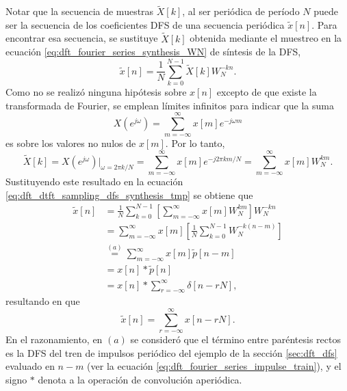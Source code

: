 \documentclass[a4paper]{report}
\begin{document}
Notar que la secuencia de muestras \(\tilde{X}[k]\), al ser periódica de período \(N\) puede ser la secuencia de los coeficientes DFS de una secuencia periódica \(\tilde{x}[n]\). Para encontrar esa secuencia, se sustituye \(\tilde{X}[k]\) obtenida mediante el muestreo en la ecuación \ref{eq:dft_fourier_series_synthesis_WN} de síntesis de la DFS,
\begin{equation}\label{eq:dft_dtft_sampling_dfs_synthesis_tmp}
 \tilde{x}[n]=\frac{1}{N}\sum_{k=0}^{N-1}\tilde{X}[k]W_N^{-kn}. 
\end{equation}
Como no se realizó ninguna hipótesis sobre \(x[n]\) excepto de que existe la transformada de Fourier, se emplean límites infinitos para indicar que la suma
\[
 X(e^{j\omega})=\sum_{m=-\infty}^\infty x[m]e^{-j\omega m}
\]
es sobre los valores no nulos de \(x[m]\). Por lo tanto,
\[
 \tilde{X}[k]=X(e^{j\omega})\Big|_{\omega=2\pi k/N}=\sum_{m=-\infty}^\infty x[m]e^{-j2\pi km/N}
 =\sum_{m=-\infty}^\infty x[m]W_N^{km}.
\]
Sustituyendo este resultado en la ecuación \ref{eq:dft_dtft_sampling_dfs_synthesis_tmp} se obtiene que 
\begin{align*}
 \tilde{x}[n]&=\frac{1}{N}\sum_{k=0}^{N-1}\left[\sum_{m=-\infty}^\infty x[m]W_N^{km}\right]W_N^{-kn}\\
   &=\sum_{m=-\infty}^\infty x[m]\left[\frac{1}{N}\sum_{k=0}^{N-1}W_N^{-k(n-m)}\right]\\
   &\overset{(a)}{=}\sum_{m=-\infty}^\infty x[m]\tilde{p}[n-m]\\
   &=x[n]*\tilde{p}[n]\\
   &=x[n]*\sum_{r=-\infty}^\infty\delta[n-rN],
\end{align*}
resultando en que 
\begin{equation}\label{eq:dft_dtft_sampling_xn}
 \tilde{x}[n]=\sum_{r=-\infty}^\infty x[n-rN].
\end{equation}
En el razonamiento, en \((a)\) se consideró que el término entre paréntesis rectos es la DFS del tren de impulsos periódico del ejemplo de la sección \ref{sec:dft_dfs} evaluado en \(n-m\) (ver la ecuación \ref{eq:dft_fourier_series_impulse_train}), y el signo \(*\) denota a la operación de convolución aperiódica.
\end{document}
